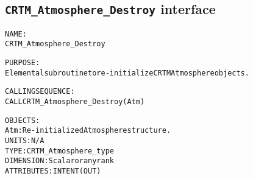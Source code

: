 \subsection{\texttt{CRTM\_Atmosphere\_Destroy} interface}
  \label{sec:CRTM_Atmosphere_Destroy_interface}
  \begin{alltt}
 
  NAME:
        CRTM_Atmosphere_Destroy
  
  PURPOSE:
        Elemental subroutine to re-initialize CRTM Atmosphere objects.
 
  CALLING SEQUENCE:
        CALL CRTM_Atmosphere_Destroy( Atm )
 
  OBJECTS:
        Atm:          Re-initialized Atmosphere structure.
                      UNITS:      N/A
                      TYPE:       CRTM_Atmosphere_type
                      DIMENSION:  Scalar or any rank
                      ATTRIBUTES: INTENT(OUT)
 
  \end{alltt}

